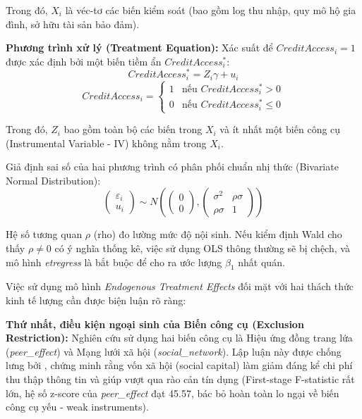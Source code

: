 \documentclass[12pt,a4paper]{report}
\begin{document}
Trong đó, $X_i$ là véc-tơ các biến kiểm soát (bao gồm log thu nhập, quy mô hộ gia đình, sở hữu tài sản bảo đảm).

\textbf{Phương trình xử lý (Treatment Equation):}
Xác suất để $CreditAccess_i = 1$ được xác định bởi một biến tiềm ẩn $CreditAccess_i^*$:
\begin{equation}
	CreditAccess_i^* = Z_i \gamma + u_i
	\label{eq:treatment}
\end{equation}
\begin{equation}
	CreditAccess_i = 
	\begin{cases}
		1 & \text{nếu } CreditAccess_i^* > 0 \\
		0 & \text{nếu } CreditAccess_i^* \leq 0
	\end{cases}
\end{equation}

Trong đó, $Z_i$ bao gồm toàn bộ các biến trong $X_i$ và ít nhất một biến công cụ (Instrumental Variable - IV) không nằm trong $X_i$. 

Giả định sai số của hai phương trình có phân phối chuẩn nhị thức (Bivariate Normal Distribution):
\begin{equation}
	\begin{pmatrix} \varepsilon_i \\ u_i \end{pmatrix} \sim N \left( \begin{pmatrix} 0 \\ 0 \end{pmatrix}, \begin{pmatrix} \sigma^2 & \rho\sigma \\ \rho\sigma & 1 \end{pmatrix} \right)
\end{equation}

Hệ số tương quan $\rho$ (rho) đo lường mức độ nội sinh. Nếu kiểm định Wald cho thấy $\rho \neq 0$ có ý nghĩa thống kê, việc sử dụng OLS thông thường sẽ bị chệch, và mô hình \textit{etregress} là bắt buộc để cho ra ước lượng $\beta_1$ nhất quán.

Việc sử dụng mô hình \textit{Endogenous Treatment Effects} đối mặt với hai thách thức kinh tế lượng cần được biện luận rõ ràng:

\textbf{Thứ nhất, điều kiện ngoại sinh của Biến công cụ (Exclusion Restriction):} 
Nghiên cứu sử dụng hai biến công cụ là Hiệu ứng đồng trang lứa (\textit{peer\_effect}) và Mạng lưới xã hội (\textit{social\_network}). Lập luận này được chống lưng bởi \textcite{Gine2010}, chứng minh rằng vốn xã hội (social capital) làm giảm đáng kể chi phí thu thập thông tin và giúp vượt qua rào cản tín dụng (First-stage F-statistic rất lớn, hệ số z-score của \textit{peer\_effect} đạt 45.57, bác bỏ hoàn toàn lo ngại về biến công cụ yếu - weak instruments). 
\end{document}
